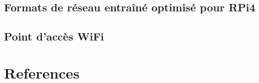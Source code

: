 \documentclass[11pt,serif,mathserif,compress,hyperref={colorlinks}]{beamer}
\begin{document}
\subsection{Formats de réseau entraîné optimisé pour RPi4}

\subsection{Point d'accès WiFi}

\subsection{}

\subsection{}


\section{References}
\end{document}
